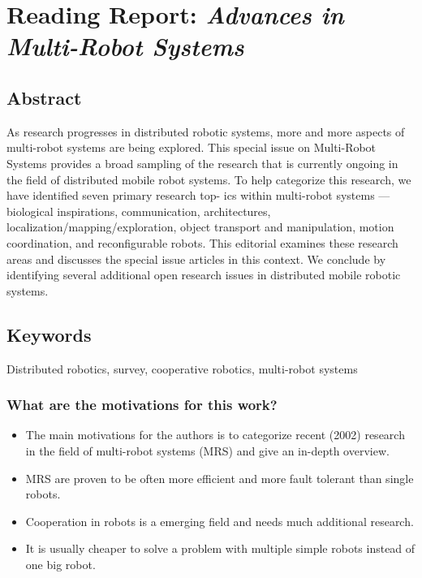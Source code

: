     \section{Reading Report: \emph{Advances in Multi-Robot Systems}}
    \cite{Arai2002}
    
    \subsection*{Abstract}
    As research progresses in distributed robotic systems, more and more aspects of multi-robot systems are being
    explored. This special issue on Multi-Robot Systems provides
    a broad sampling of the research that is currently ongoing in
    the field of distributed mobile robot systems. To help categorize this research, we have identified seven primary research top-
    ics within multi-robot systems — biological inspirations, communication, architectures, localization/mapping/exploration, object
    transport and manipulation, motion coordination, and reconfigurable robots. This editorial examines these research areas and
    discusses the special issue articles in this context. We conclude by
    identifying several additional open research issues in distributed
    mobile robotic systems.
    
    
    \subsection*{Keywords}
    Distributed robotics, survey, cooperative robotics, multi-robot systems
    
    
    
     
    \subsubsection*{What are the motivations for this work?}
    \begin{itemize}
        \item The main motivations for the authors is to categorize recent (2002) research in the field of multi-robot systems (MRS) and give an in-depth overview.
        \item MRS are proven to be often more efficient and more fault tolerant than single robots. 
        \item Cooperation in robots is a emerging field and needs much additional research.
        \item It is usually cheaper to solve a problem with multiple simple robots instead of one big robot.
    \end{itemize}
